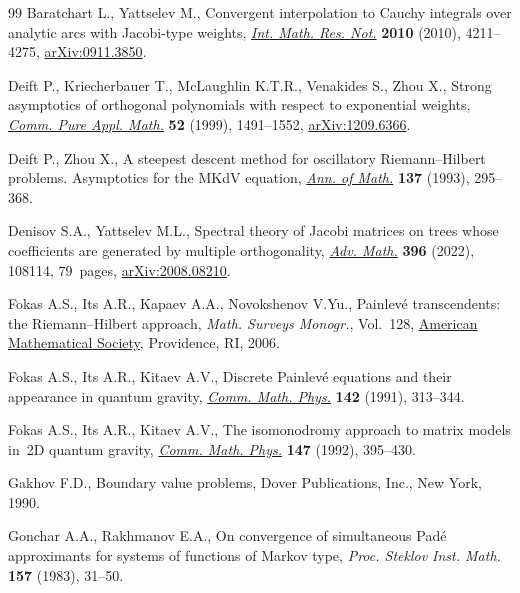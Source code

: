 \documentclass[10pt,a4paper]{amsart}
\numberwithin{equation}{section}
\begin{document}
\begin{thebibliography}{99}
Baratchart L., Yattselev M., Convergent interpolation to {C}auchy integrals
 over analytic arcs with {J}acobi-type weights,
 \href{https://doi.org/10.1093/imrn/rnq026}{\textit{Int. Math. Res. Not.}}
 \textbf{2010} (2010), 4211--4275, \href{http://arxiv.org/abs/0911.3850}{arXiv:0911.3850}.

Deift P., Kriecherbauer T., McLaughlin K.T.R., Venakides S., Zhou X., Strong
 asymptotics of orthogonal polynomials with respect to exponential weights,
 \href{https://doi.org/10.1002/(sici)1097-0312(199912)52:12&lt;1491::aid-cpa2&gt;3.0.co;2-#}{\textit{Comm.
 Pure Appl. Math.}} \textbf{52} (1999), 1491--1552, \href{http://arxiv.org/abs/1209.6366}{arXiv:1209.6366}.

Deift P., Zhou X., A steepest descent method for oscillatory
 {R}iemann--{H}ilbert problems. {A}symptotics for the {MK}d{V} equation,
 \href{https://doi.org/10.2307/2946540}{\textit{Ann. of Math.}} \textbf{137}
 (1993), 295--368.

Denisov S.A., Yattselev M.L., Spectral theory of {J}acobi matrices on trees
 whose coefficients are generated by multiple orthogonality,
 \href{https://doi.org/10.1016/j.aim.2021.108114}{\textit{Adv. Math.}}
 \textbf{396} (2022), 108114, 79~pages, \href{http://arxiv.org/abs/2008.08210}{arXiv:2008.08210}.

Fokas A.S., Its A.R., Kapaev A.A., Novokshenov V.Yu., Painlev\'e transcendents:
 the {R}iemann--{H}ilbert approach, \textit{Math. Surveys Monogr.}, Vol.~128,
 \href{https://doi.org/10.1090/surv/128}{American Mathematical Society},
 Providence, RI, 2006.

Fokas A.S., Its A.R., Kitaev A.V., Discrete {P}ainlev\'e equations and their
 appearance in quantum gravity,
 \href{https://doi.org/10.1007/BF02102066}{\textit{Comm. Math. Phys.}}
 \textbf{142} (1991), 313--344.

Fokas A.S., Its A.R., Kitaev A.V., The isomonodromy approach to matrix models
 in~2D quantum gravity,
 \href{https://doi.org/10.1007/BF02096594}{\textit{Comm. Math. Phys.}}
 \textbf{147} (1992), 395--430.

Gakhov F.D., Boundary value problems, Dover Publications, Inc., New York, 1990.

Gonchar A.A., Rakhmanov E.A., On convergence of simultaneous {P}ad\'e
 approximants for systems of functions of {M}arkov type, \textit{Proc. Steklov
 Inst. Math.} \textbf{157} (1983), 31--50.


\end{thebibliography}
\end{document}
